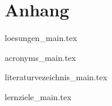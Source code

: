 \part{Anhang}

{
{loesungen_main.tex}
}
{}

{acronyms_main.tex}

{literaturvezeichnis_main.tex}

{lernziele_main.tex}